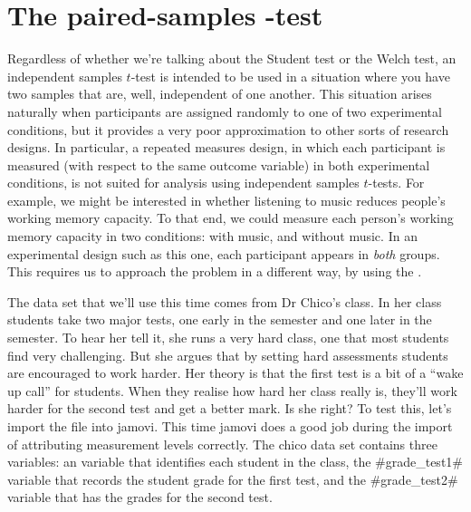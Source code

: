 \vspace*{12pt}


\section{The paired-samples \texorpdfstring{}{}-test~\label{sec:pairedsamplesttest}}

Regardless of whether we're talking about the Student test or the Welch test, an independent samples $t$-test is intended to be used in a situation where you have two samples that are, well, independent of one another. This situation arises naturally when participants are assigned randomly to one of two experimental conditions, but it provides a very poor approximation to other sorts of research designs. In particular, a repeated measures design, in which each participant is measured (with respect to the same outcome variable) in both experimental conditions, is not suited for analysis using independent samples $t$-tests. For example, we might be interested in whether listening to music reduces people's working memory capacity. To that end, we could measure each person's working memory capacity in two conditions: with music, and without music. In an experimental design such as this one, each participant appears in {\it both} groups. This requires us to approach the problem in a different way, by using the . 


The data set that we'll use this time comes from Dr Chico's class. In her class students take two major tests, one early in the semester and one later in the semester. To hear her tell it, she runs a very hard class, one that most students find very challenging. But she argues that by setting hard assessments students are encouraged to work harder. Her theory is that the first test is a bit of a ``wake up call'' for students. When they realise how hard her class really is, they'll work harder for the second test and get a better mark. Is she right? To test this, let's import the  file into jamovi. This time jamovi does a good job during the import of attributing measurement levels correctly. The chico data set contains three variables: an  variable that identifies each student in the class, the \rtextverb#grade\_test1# variable that records the student grade for the first test, and the \rtextverb#grade\_test2# variable that has the grades for the second test. 

